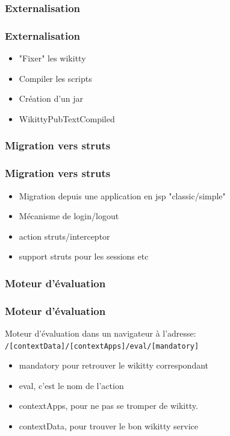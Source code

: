 \documentclass[12pt,a4paper,utf8x]{beamer}
\begin{document}
\subsubsection*{Externalisation}
\begin{frame}\frametitle{Externalisation}
\begin{itemize}
\item "Fixer" les wikitty
\item Compiler les scripts
\item Création d'un jar
\item WikittyPubTextCompiled
\end{itemize}
\end{frame}

\subsubsection*{Migration vers struts}
\begin{frame}\frametitle{Migration vers struts}
\begin{itemize}
\item Migration depuis une application en jsp "classic/simple"
\item Mécanisme de login/logout
\item action struts/interceptor
\item support struts pour les sessions etc
\end{itemize}
\end{frame}




\subsubsection*{Moteur d'évaluation}
\begin{frame}\frametitle{Moteur d'évaluation}

Moteur d'évaluation dans un navigateur à l'adresse:\\
\verb!/[contextData]/[contextApps]/eval/[mandatory]!

\begin{itemize}
\item mandatory pour retrouver le wikitty correspondant
\item eval, c'est le nom de l'action
\item contextApps, pour ne pas se tromper de wikitty.
\item contextData, pour trouver le bon wikitty service
\end{itemize}



\end{frame}
\end{document}
